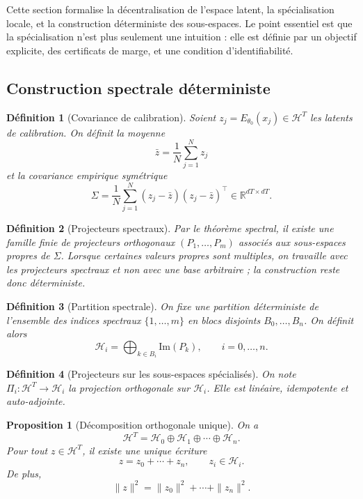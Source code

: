 \documentclass[11pt,a4paper]{article}
\newtheorem{definition}{Définition}[section]
\newtheorem{proposition}{Proposition}[section]
\newcommand{\Hh}{\mathcal H}
\newcommand{\R}{\mathbb R}
\newcommand{\1}{\mathbf 1}
\begin{document}
Cette section formalise la décentralisation de l'espace latent, la spécialisation locale, et la construction déterministe des sous-espaces.  
Le point essentiel est que la spécialisation n'est plus seulement une intuition : elle est définie par un objectif explicite, des certificats de marge, et une condition d'identifiabilité.

\subsection{Construction spectrale déterministe}

\begin{definition}[Covariance de calibration]
Soient \(z_j=E_{\theta_0}(x_j)\in\Hh^T\) les latents de calibration.  
On définit la moyenne
\[
\bar z=\frac1N\sum_{j=1}^N z_j
\]
et la covariance empirique symétrique
\[
\Sigma=\frac1N\sum_{j=1}^N (z_j-\bar z)(z_j-\bar z)^\top\in\R^{dT\times dT}.
\]
\end{definition}

\begin{definition}[Projecteurs spectraux]
Par le théorème spectral, il existe une famille finie de projecteurs orthogonaux \((P_1,\dots,P_m)\) associés aux sous-espaces propres de \(\Sigma\).  
Lorsque certaines valeurs propres sont multiples, on travaille avec les projecteurs spectraux et non avec une base arbitraire ; la construction reste donc déterministe.
\end{definition}

\begin{definition}[Partition spectrale]
On fixe une partition déterministe de l'ensemble des indices spectraux \(\{1,\dots,m\}\) en blocs disjoints \(B_0,\dots,B_n\).  
On définit alors
\[
\Hh_i=\bigoplus_{k\in B_i}\mathrm{Im}(P_k),\qquad i=0,\dots,n.
\]
\end{definition}

\begin{definition}[Projecteurs sur les sous-espaces spécialisés]
On note \(\Pi_i:\Hh^T\to\Hh_i\) la projection orthogonale sur \(\Hh_i\).  
Elle est linéaire, idempotente et auto-adjointe.
\end{definition}

\begin{proposition}[Décomposition orthogonale unique]
On a
\[
\Hh^T=\Hh_0\oplus\Hh_1\oplus\cdots\oplus\Hh_n.
\]
Pour tout \(z\in\Hh^T\), il existe une unique écriture
\[
z=z_0+\cdots+z_n,
\qquad
z_i\in\Hh_i.
\]
De plus,
\[
\|z\|^2=\|z_0\|^2+\cdots+\|z_n\|^2.
\]
\end{proposition}
\end{document}
